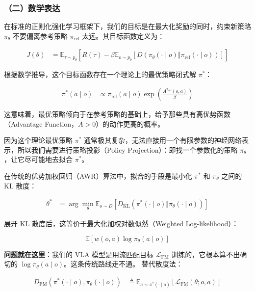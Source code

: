 \hypertarget{ux4e8cux6570ux5b66ux8868ux8fbe-3}{%
\subsubsection{（二）数学表达}\label{ux4e8cux6570ux5b66ux8868ux8fbe-3}}

在标准的正则化强化学习框架下，我们的目标是在最大化奖励的同时，约束新策略 \(\pi_\theta\) 不要偏离参考策略 \(\pi_{\mathrm{ref}}\) 太远。其目标函数定义为：

\[
\begin{aligned}
J(\theta)
&= \mathbb{E}_{\tau \sim p_\theta}
\left[
R(\tau)
- \beta \mathbb{E}_{o \sim p_\theta}
\left[D(\pi_\theta(\cdot \mid o) \Vert \pi_{\mathrm{ref}}(\cdot \mid o))\right]
\right]
\end{aligned}
\]

根据数学推导，这个目标函数存在一个理论上的最优策略闭式解 \(\pi^{*}\)：

\[
\begin{aligned}
\pi^{*}(a \mid o)
&\propto
\pi_{\mathrm{ref}}(a \mid o)
\exp\left(\frac{A^{\pi_{\mathrm{ref}}}(o, a)}{\beta}\right)
\end{aligned}
\]

这意味着，最优策略倾向于在参考策略的基础上，给予那些具有高优势函数（Advantage Function，\(A > 0\)）的动作更高的概率。

因为这个理论最优策略 \(\pi^{*}\) 通常极其复杂，无法直接用一个有限参数的神经网络表示，所以我们需要进行策略投影（Policy Projection）：即找一个参数化的策略 \(\pi_\theta\)，让它尽可能地去拟合 \(\pi^{*}\)。

在传统的优势加权回归（AWR）算法中，拟合的手段是最小化 \(\pi^{*}\) 和 \(\pi_\theta\) 之间的 KL 散度：

\[
\begin{aligned}
\theta^{*}
&= \arg\min_\theta
\mathbb{E}_{o \sim D}
\left[
D_{\mathrm{KL}}(\pi^{*}(\cdot \mid o) \Vert \pi_\theta(\cdot \mid o))
\right]
\end{aligned}
\]

展开 KL 散度后，这等价于最大化加权对数似然（Weighted Log-likelihood）：

\[
\mathbb{E}\left[w(o, a)\log \pi_\theta(a \mid o)\right]
\]

\textbf{问题就在这里}：我们的 VLA 模型是用流匹配目标 \(\mathcal{L}_{\mathrm{FM}}\) 训练的，它根本算不出确切的 \(\log \pi_\theta(a \mid o)\)。这条传统路线走不通。
替代散度法：

\[
\begin{aligned}
D_{\mathrm{FM}}(\pi^{*}(\cdot \mid o), \pi_\theta(\cdot \mid o))
&\triangleq
\mathbb{E}_{a \sim \pi^{*}(\cdot \mid o)}
\left[\mathcal{L}_{\mathrm{FM}}(\theta; o, a)\right]
\end{aligned}
\]

